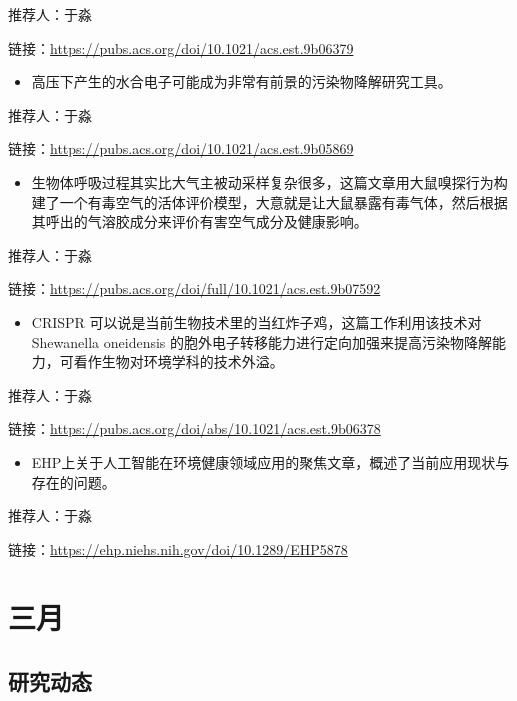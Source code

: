 \documentclass[]{book}
\providecommand{\tightlist}{%
  \setlength{\itemsep}{0pt}\setlength{\parskip}{0pt}}
\begin{document}
推荐人：于淼

链接：\url{https://pubs.acs.org/doi/10.1021/acs.est.9b06379}

\begin{itemize}
\tightlist
\item
  高压下产生的水合电子可能成为非常有前景的污染物降解研究工具。
\end{itemize}

推荐人：于淼

链接：\url{https://pubs.acs.org/doi/10.1021/acs.est.9b05869}

\begin{itemize}
\tightlist
\item
  生物体呼吸过程其实比大气主被动采样复杂很多，这篇文章用大鼠嗅探行为构建了一个有毒空气的活体评价模型，大意就是让大鼠暴露有毒气体，然后根据其呼出的气溶胶成分来评价有害空气成分及健康影响。
\end{itemize}

推荐人：于淼

链接：\url{https://pubs.acs.org/doi/full/10.1021/acs.est.9b07592}

\begin{itemize}
\tightlist
\item
  CRISPR 可以说是当前生物技术里的当红炸子鸡，这篇工作利用该技术对 Shewanella oneidensis 的胞外电子转移能力进行定向加强来提高污染物降解能力，可看作生物对环境学科的技术外溢。
\end{itemize}

推荐人：于淼

链接：\url{https://pubs.acs.org/doi/abs/10.1021/acs.est.9b06378}

\begin{itemize}
\tightlist
\item
  EHP上关于人工智能在环境健康领域应用的聚焦文章，概述了当前应用现状与存在的问题。
\end{itemize}

推荐人：于淼

链接：\url{https://ehp.niehs.nih.gov/doi/10.1289/EHP5878}

\hypertarget{ux4e09ux6708-2}{%
\section*{三月}\label{ux4e09ux6708-2}}

\hypertarget{ux7814ux7a76ux52a8ux6001-28}{%
\subsection*{研究动态}\label{ux7814ux7a76ux52a8ux6001-28}}
\end{document}
